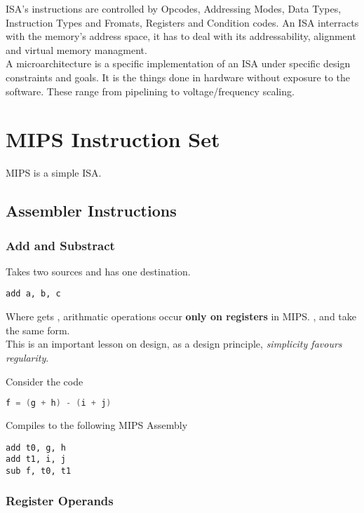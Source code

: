 \documentclass[11pt,a4paper,twocolumn]{book}
\begin{document}
ISA's instructions are controlled by Opcodes, Addressing Modes, Data Types, Instruction Types and Fromats, Registers and Condition codes. An ISA interracts with the memory's address space, it has to deal with its addressability, alignment and virtual memory managment.\\

A microarchitecture is a specific implementation of an ISA under specific design constraints and goals. It is the things done in hardware without exposure to the software. These range from pipelining to voltage/frequency scaling.

\section{MIPS Instruction Set}

MIPS is a simple ISA.

\subsection{Assembler Instructions}

\subsubsection{Add and Substract}

Takes two sources and has one destination.

\begin{lstlisting}
add a, b, c
\end{lstlisting}

Where  gets , arithmatic operations occur \textbf{only on registers} in MIPS. ,  and  take the same form.\\

This is an important lesson on design, as a design principle, \textit{simplicity favours regularity}.

Consider the code

\begin{lstlisting}[language=C]
f = (g + h) - (i + j)
\end{lstlisting}

Compiles to the following MIPS Assembly

\begin{lstlisting}
add t0, g, h
add t1, i, j
sub f, t0, t1
\end{lstlisting}

\subsubsection{Register Operands}
\end{document}
